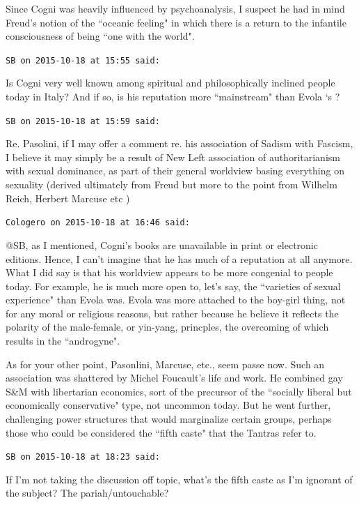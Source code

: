\begin{footnotesize}
\begin{sffamily}
Since Cogni was heavily influenced by psychoanalysis, I suspect he had in mind Freud's notion of the ``oceanic feeling" in which there is a return to the infantile consciousness of being ``one with the world".


\hfill

\texttt{SB on 2015-10-18 at 15:55 said: }

Is Cogni very well known among spiritual and philosophically inclined people today in Italy? And if so, is his reputation more ``mainstream" than Evola `s ?


\hfill

\texttt{SB on 2015-10-18 at 15:59 said: }

Re. Pasolini, if I may offer a comment re. his association of Sadism with Fascism, I believe it may simply be a result of New Left association of authoritarianism with sexual dominance, as part of their general worldview basing everything on sexuality (derived ultimately from Freud but more to the point from Wilhelm Reich, Herbert Marcuse etc )


\hfill

\texttt{Cologero on 2015-10-18 at 16:46 said: }

@SB, as I mentioned, Cogni's books are unavailable in print or electronic editions. Hence, I can't imagine that he has much of a reputation at all anymore. What I did say is that his worldview appears to be more congenial to people today. For example, he is much more open to, let's say, the ``varieties of sexual experience" than Evola was. Evola was more attached to the boy-girl thing, not for any moral or religious reasons, but rather because he believe it reflects the polarity of the male-female, or yin-yang, princples, the overcoming of which results in the ``androgyne".

As for your other point, Pasonlini, Marcuse, etc., seem passe now. Such an association was shattered by Michel Foucault's life and work. He combined gay S\&M with libertarian economics, sort of the precursor of the ``socially liberal but economically conservative" type, not uncommon today. But he went further, challenging power structures that would marginalize certain groups, perhaps those who could be considered the ``fifth caste" that the Tantras refer to.


\hfill

\texttt{SB on 2015-10-18 at 18:23 said: }

If I'm not taking the discussion off topic, what's the fifth caste as I'm ignorant of the subject? The pariah/untouchable? 


\end{sffamily}
\end{footnotesize}
